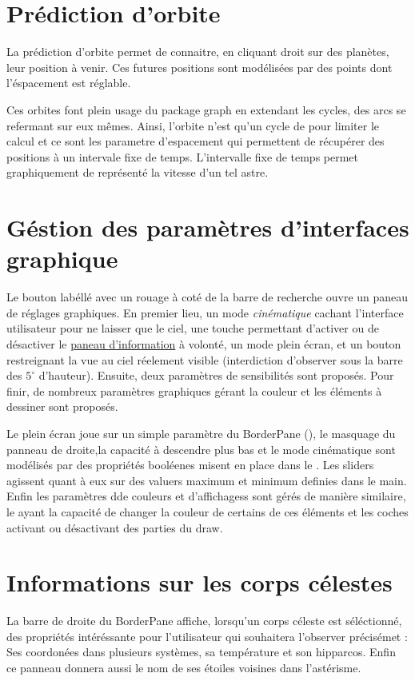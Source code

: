 \documentclass[10pt,a4paper]{report}
\begin{document}
\section{Prédiction d'orbite}

La prédiction d'orbite permet de connaitre, en cliquant droit sur des planètes, leur position à venir. Ces futures positions sont modélisées par des points dont l'éspacement est réglable.

Ces orbites font plein usage du package graph en extendant les cycles, des arcs se refermant sur eux mêmes. Ainsi, l'orbite n'est qu'un cycle de  pour limiter le calcul et ce sont les parametre d'espacement qui permettent de récupérer des positions à un intervale fixe de temps. L'intervalle fixe de temps permet graphiquement de représenté la vitesse d'un tel astre.  

\section{Géstion des paramètres d'interfaces graphique}

Le bouton labéllé avec un rouage à coté de la barre de recherche ouvre un paneau de réglages graphiques. En premier lieu, un mode \textit{cinématique} cachant l'interface utilisateur pour ne laisser que le ciel, une touche permettant d'activer ou de désactiver 
le \hyperref[sec:info]{paneau d'information} à volonté, un mode plein écran, et un bouton restreignant la vue au ciel réelement visible (interdiction d'observer sous la barre des $5^{\circ}$ d'hauteur). Ensuite, deux paramètres de sensibilités sont proposés. Pour finir, de nombreux paramètres graphiques gérant la couleur et les éléments à dessiner sont proposés. 

Le plein écran joue sur un simple paramètre du BorderPane (), le masquage du panneau de droite,la capacité à descendre plus bas et le mode cinématique sont modélisés par des propriétés booléenes misent en place dans le .
Les sliders agissent quant à eux sur des valuers maximum et minimum definies dans le main. Enfin les paramètres dde couleurs et d'affichagess sont gérés de manière similaire, le  ayant la capacité de changer la couleur de certains de ces éléments et les coches activant ou désactivant des parties du draw.




\section{Informations sur les corps célestes}
\label{sec:info}
La barre de droite du BorderPane affiche, lorsqu'un corps céleste est séléctionné, des propriétés intéréssante pour l'utilisateur qui souhaitera l'observer précisémet : Ses coordonées dans plusieurs systèmes, sa température et son hipparcos. Enfin ce panneau donnera aussi le nom de ses étoiles voisines dans l'astérisme.
\end{document}

